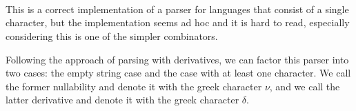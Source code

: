 \begin{code}%
%
\>[4]\AgdaSpace{}%
\AgdaSymbol{:}\AgdaSpace{}%
\AgdaSymbol{(}\AgdaSpace{}%
\AgdaSymbol{:}\AgdaSpace{}%
\AgdaSymbol{)}\AgdaSpace{}%
\AgdaSpace{}%
\AgdaSpace{}%
\AgdaSymbol{(}\AgdaSpace{}%
\AgdaSymbol{)}\<%
\\
%
\>[4]\AgdaSymbol{(}\AgdaSpace{}%
\AgdaSymbol{\AgdaUnderscore{})}\AgdaSpace{}%
\AgdaInductiveConstructor{[]}\AgdaSpace{}%
\AgdaSymbol{=}\AgdaSpace{}%
\AgdaSpace{}%
\AgdaSpace{}%
\AgdaSymbol{()}\<%
\\
%
\>[4]\AgdaSymbol{(}\AgdaSpace{}%
\AgdaSymbol{)}\AgdaSpace{}%
\AgdaSymbol{(}\AgdaSpace{}%
\AgdaSpace{}%
\AgdaInductiveConstructor{[]}\AgdaSymbol{)}\AgdaSpace{}%
\AgdaSymbol{=}\AgdaSpace{}%
\AgdaSpace{}%
\AgdaSymbol{(}\AgdaSpace{}%
\AgdaSpace{}%
\AgdaSymbol{\{}\AgdaSpace{}%
\AgdaSpace{}%
\AgdaSpace{}%
\AgdaSpace{}%
\AgdaSymbol{\})}\AgdaSpace{}%
\AgdaSpace{}%
\AgdaSymbol{\{}\AgdaSpace{}%
\AgdaSpace{}%
\AgdaSpace{}%
\AgdaSpace{}%
\AgdaSymbol{\}))}\AgdaSpace{}%
\AgdaSymbol{(}\AgdaSpace{}%
\AgdaSpace{}%
\AgdaSymbol{)}\<%
\\
%
\>[4]\AgdaSymbol{(}\AgdaSpace{}%
\AgdaSymbol{\AgdaUnderscore{})}\AgdaSpace{}%
\AgdaSymbol{(\AgdaUnderscore{}}\AgdaSpace{}%
\AgdaSpace{}%
\AgdaSymbol{\AgdaUnderscore{}}\AgdaSpace{}%
\AgdaSpace{}%
\AgdaSymbol{\AgdaUnderscore{})}\AgdaSpace{}%
\AgdaSymbol{=}\AgdaSpace{}%
\AgdaSpace{}%
\AgdaSpace{}%
\AgdaSymbol{()}\<%
\end{code}

This is a correct implementation of a parser for languages that consist of a single character, but the implementation seems ad hoc and it is hard to read, especially considering this is one of the simpler combinators.

Following the approach of parsing with derivatives, we can factor this parser into two cases: the empty string case and the case with at least one character.  We call the former nullability and denote it with the greek character $ν$, and we call the latter derivative and denote it with the greek character $δ$. 

